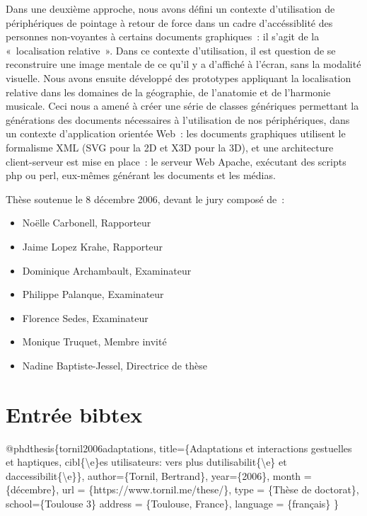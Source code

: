 \documentclass[
]{book}
\newenvironment{Shaded}{\begin{snugshade}}{\end{snugshade}}
\newcommand{\CharTok}[1]{\textcolor[rgb]{0.31,0.60,0.02}{#1}}
\newcommand{\DataTypeTok}[1]{\textcolor[rgb]{0.13,0.29,0.53}{#1}}
\newcommand{\NormalTok}[1]{#1}
\newcommand{\OtherTok}[1]{\textcolor[rgb]{0.56,0.35,0.01}{#1}}
\newcommand{\VariableTok}[1]{\textcolor[rgb]{0.00,0.00,0.00}{#1}}
\providecommand{\tightlist}{%
  \setlength{\itemsep}{0pt}\setlength{\parskip}{0pt}}
\begin{document}
Dans une deuxième approche, nous avons défini un contexte d'utilisation de
périphériques de pointage à retour de force dans un cadre d'accéssiblité des
personnes non-voyantes à certains documents graphiques~: il s'agit de la
«~localisation relative~». Dans ce contexte d'utilisation, il est question de
se reconstruire une image mentale de ce qu'il y a d'affiché à l'écran, sans
la modalité visuelle. Nous avons ensuite développé des prototypes appliquant
la localisation relative dans les domaines de la géographie, de l'anatomie et
de l'harmonie musicale. Ceci nous a amené à créer une série de classes
génériques permettant la générations des documents nécessaires à
l'utilisation de nos périphériques, dans un contexte d'application orientée
Web~: les documents graphiques utilisent le formalisme XML (SVG pour la 2D et
X3D pour la 3D), et une architecture client-serveur est mise en place~: le
serveur Web Apache, exécutant des scripts php ou perl, eux-mêmes générant les
documents et les médias.

Thèse soutenue le 8 décembre 2006, devant le jury composé de~:

\begin{itemize}
\tightlist
\item
  Noëlle Carbonell, Rapporteur
\item
  Jaime Lopez Krahe, Rapporteur
\item
  Dominique Archambault, Examinateur
\item
  Philippe Palanque, Examinateur
\item
  Florence Sedes, Examinateur
\item
  Monique Truquet, Membre invité
\item
  Nadine Baptiste-Jessel, Directrice de thèse
\end{itemize}

\hypertarget{entruxe9e-bibtex}{%
\section*{Entrée bibtex}\label{entruxe9e-bibtex}}

\begin{Shaded}
\begin{Highlighting}[]
\VariableTok{@phdthesis}\NormalTok{\{}\OtherTok{tornil2006adaptations}\NormalTok{,}
  \DataTypeTok{title}\NormalTok{=\{Adaptations et interactions gestuelles et haptiques, cibl\{}\CharTok{\textbackslash{}\textquotesingle{}}\NormalTok{e\}es utilisateurs: vers plus d\textquotesingle{}utilisabilit\{}\CharTok{\textbackslash{}\textquotesingle{}}\NormalTok{e\} et d\textquotesingle{}accessibilit\{}\CharTok{\textbackslash{}\textquotesingle{}}\NormalTok{e\}\},}
  \DataTypeTok{author}\NormalTok{=\{Tornil, Bertrand\},}
  \DataTypeTok{year}\NormalTok{=\{2006\},}
  \DataTypeTok{month}\NormalTok{ = \{décembre\},}
  \DataTypeTok{url}\NormalTok{ = \{https://www.tornil.me/these/\},}
  \DataTypeTok{type}\NormalTok{ = \{Thèse de doctorat\},}
  \DataTypeTok{school}\NormalTok{=\{Toulouse 3\}}
  \DataTypeTok{address}\NormalTok{ = \{Toulouse, France\},}
  \DataTypeTok{language}\NormalTok{ = \{français\}}
\NormalTok{\}}
\end{Highlighting}
\end{Shaded}
\end{document}
